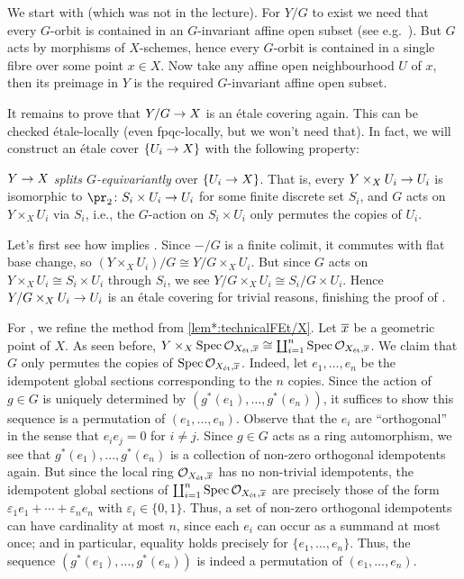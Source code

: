 \begin{proof*}
	We start with  (which was not in the lecture). For $Y/G$ to exist we need that every $G$-orbit is contained in an $G$-invariant affine open subset (see e.g.\ \cite[Theorem~11]{jacobians}). But $G$ acts by morphisms of $X$-schemes, hence every $G$-orbit is contained in a single fibre over some point $x\in X$. Now take any affine open neighbourhood $U$ of $x$, then its preimage in $Y$ is the required $G$-invariant affine open subset.
	
	It remains to prove that $Y/G\morphism X$ is an étale covering again. This can be checked étale-locally (even fpqc-locally, but we won't need that). In fact, we will construct an étale cover $\{U_i\morphism X\}$ with the following property:
	\begin{alphanumerate}
		\item[\itememph{*}] $Y\morphism X$ \emph{splits $G$-equivariantly} over $\{U_i\morphism X\}$. That is, every $Y\times_XU_i\morphism U_i$ is isomorphic to $\pr_2\colon S_i\times U_i\morphism U_i$ for some finite discrete set $S_i$, and $G$ acts on $Y\times_XU_i$ via $S_i$, i.e., the $G$-action on $S_i\times U_i$ only permutes the copies of $U_i$.
	\end{alphanumerate}
	Let's first see how \itememph{*} implies . Since $-/G$ is a finite colimit, it commutes with flat base change, so $(Y\times_XU_i)/G\cong Y/G\times_XU_i$. But since $G$ acts on $Y\times_XU_i\cong S_i\times U_i$  through $S_i$, we see $Y/G\times_XU_i\cong S_i/G\times U_i$. Hence $Y/G\times_XU_i\morphism U_i$ is an étale covering for trivial reasons, finishing the proof of .
	
	For \itememph{*}, we refine the method from \cref{lem*:technicalFEt/X}. Let $\ov{x}$ be a geometric point of $X$. As seen before, $Y\times_X\Spec \Oo_{X_\et,\ov{x}}\cong \coprod_{i=1}^n\Spec \Oo_{X_\et,\ov{x}}$. We claim that $G$ only permutes the copies of $\Spec \Oo_{X_\et,\ov{x}}$. Indeed, let $e_1,\ldots,e_n$ be the idempotent global sections corresponding to the $n$ copies. Since the action of $g\in G$ is uniquely determined by $(g^*(e_1),\dotsc,g^*(e_n))$, it suffices to show this sequence is a permutation of $(e_1,\dotsc,e_n)$. Observe that the $e_i$ are \enquote{orthogonal} in the sense that $e_ie_j=0$ for $i\neq j$. Since $g\in G$ acts as a ring automorphism, we see that $g^*(e_1),\dotsc,g^*(e_n)$ is a collection of non-zero orthogonal idempotents again. But since the local ring $\Oo_{X_\et,\ov{x}}$ has no non-trivial idempotents, the idempotent global sections of $\coprod_{i=1}^n\Spec \Oo_{X_\et,\ov{x}}$ are precisely those of the form $\varepsilon_1e_1+\dotsb+\varepsilon_ne_n$ with $\varepsilon_i\in\{0,1\}$. Thus, a set of non-zero orthogonal idempotents can have cardinality at most $n$, since each $e_i$ can occur as a summand at most once; and in particular, equality holds precisely for $\{e_1,\dotsc,e_n\}$. Thus, the sequence $(g^*(e_1),\dotsc,g^*(e_n))$ is indeed a permutation of $(e_1,\dotsc,e_n)$.
	

\end{proof*}
